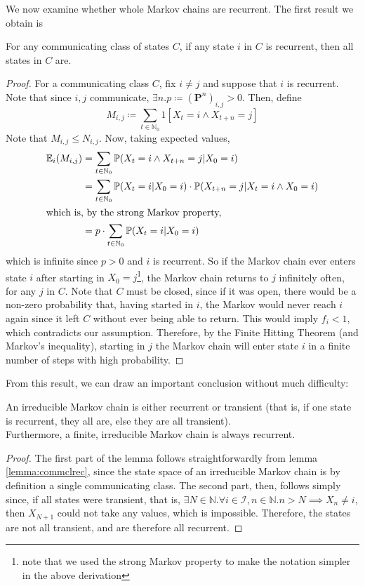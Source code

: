 			We now examine whether whole Markov chains are recurrent. The first result we obtain is
			\begin{lemma}
				\label{lemma:commclrec}
				For any communicating class of states $C$, if any state $i$ in $C$ is recurrent,
				then all states in $C$ are.
			\end{lemma}
			\begin{proof}
				For a communicating class $C$, fix $i \neq j$ and suppose that $i$ is recurrent. 
				Note that since $i, j$ 
				communicate, $\exists n . p \coloneqq (\mathbf{P}^n)_{i,j} > 0$. Then, define 
				$$
					M_{i,j} \coloneqq \sum_{t \in \mathbb{N}_0} 1[X_t = i \land X_{t+n} = j]
				$$
				Note that $M_{i,j} \leq N_{i,j}$. Now, taking expected values, 
				\begin{align*}
					\mathbb{E}_i(M_{i,j}) &= \sum_{t \in \mathbb{N}_0} 
					\mathbb{P}(X_t = i \land X_{t+n} = j | X_0 = i) \\
					&= \sum_{t \in \mathbb{N}_0} \mathbb{P}(X_t = i | X_0 = i) \cdot 
					\mathbb{P}(X_{t+n} = j | X_t = i \land X_0 = i) \\
				\intertext{which is, by the strong Markov property,}
					&= p \cdot \sum_{t \in \mathbb{N}_0} \mathbb{P}(X_t = i | X_0=i)
				\end{align*}
				which is infinite since $p > 0$ and $i$ is recurrent. So if the Markov chain 
				ever enters state $i$ after starting in $X_0 = j$\footnote{note that we used
				the strong Markov property to make the notation simpler in the above 
				derivation}, the Markov chain returns to $j$ infinitely often, for any $j$ in
				$C$. Note that $C$ must be closed, since if it was open, there would be a 
				non-zero probability that, having started in $i$, the Markov would never reach 
				$i$ again since it left $C$ without ever being able to return. 
				This would imply $f_i < 1$, which contradicts our assumption. Therefore,
				by the Finite Hitting Theorem (and Markov's inequality), starting in $j$ the
				Markov chain will enter state $i$ in a finite number of steps with high 
				probability.
			\end{proof}

			From this result, we can draw an important conclusion without much difficulty:
			\begin{lemma}
				An irreducible Markov chain is either recurrent or transient (that is, if one
				state is recurrent, they all are, else they are all transient).\\
				Furthermore, a finite, irreducible Markov chain is always recurrent.
			\end{lemma}
			\begin{proof}
				The first part of the lemma follows straightforwardly from lemma 
				\ref{lemma:commclrec}, since the state space of an irreducible Markov chain is
				by definition a single communicating class. The second part, then, follows 
				simply since, if all states were transient, that is, $\exists N \in \mathbb{N}.
				\forall i\in\mathcal{I}, n \in \mathbb{N}. n > N \implies X_n \neq i$, then 
				$X_{N+1}$ could not take any values, which is impossible. Therefore, the states
				are not all transient, and are therefore all recurrent.
			\end{proof}

